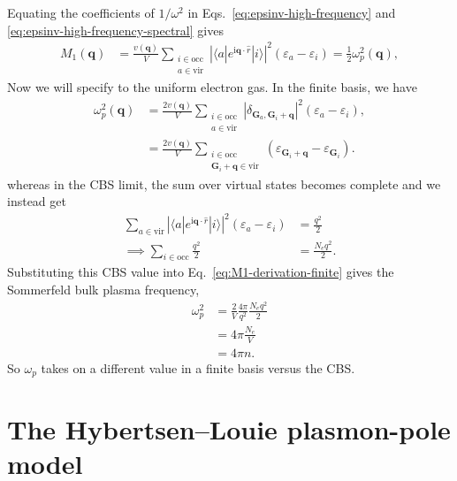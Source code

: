 \documentclass[11pt]{article}
\newcommand{\bG}{\mathbf{G}}
\newcommand{\bq}{\mathbf{q}}
\newcommand{\eps}{\varepsilon}
\newcommand{\ii}{\mathrm{i}}
\begin{document}
Equating the coefficients of $1/\omega^2$ in
Eqs.~\eqref{eq:epsinv-high-frequency} and
\eqref{eq:epsinv-high-frequency-spectral} gives
\begin{align}
  M_1(\bq)
  &=
  \frac{v(\bq)}{V}
  \sum_{\substack{i\in\mathrm{occ}\\a\in\mathrm{vir}}}
  \left|
  \langle a|e^{\ii\bq\cdot\hat r}|i\rangle
  \right|^2
  (\eps_a-\eps_i)
  =
  \frac{1}{2}\omega_p^2(\bq), \label{eq:M1-derivation-finite}
\end{align}
Now we will specify to the uniform electron gas. In the finite basis, we have
\begin{align}
  \omega_p^2(\bq)
  &=
  \frac{2v(\bq)}{V}
  \sum_{\substack{i\in\mathrm{occ}\\a\in\mathrm{vir}}}
  \left|
  \delta_{\bG_a,\bG_i+\bq}
  \right|^2
  (\eps_a-\eps_i),
  \\[6pt]
  &=
  \frac{2v(\bq)}{V}
  \sum_{\substack{i\in\mathrm{occ}\\
                  \bG_i+\bq\in\mathrm{vir}}}
  \left(
  \eps_{\bG_i+\bq}-\eps_{\bG_i}
  \right).
\end{align}
whereas in the CBS limit, the sum over virtual states becomes complete and we instead get
\begin{align}
  \sum_{a\in\mathrm{vir}}
  \left|
  \langle a|e^{\ii\bq\cdot\hat r}|i\rangle
  \right|^2
  (\eps_a-\eps_i)
  &=
  \frac{q^2}{2}\\
  \label{eq:complete-basis-single-particle-fsum}
\implies 
  \sum_{i\in\mathrm{occ}}\frac{q^2}{2}
  &=
  \frac{N_e q^2}{2}.
\end{align}
Substituting this CBS value into Eq.~\eqref{eq:M1-derivation-finite} gives
the Sommerfeld bulk plasma frequency,
\begin{align}
  \omega_p^2
  &=
  \frac{2}{V}
  \frac{4\pi}{q^2}
  \frac{N_e q^2}{2}
  \\[4pt]
  &=
  4\pi \frac{N_e}{V}
  \\[4pt]
  &=
  4\pi n.
  \label{eq:bulk-plasma-frequency}
\end{align}
{So $\omega_p$ takes on a different value in a finite basis versus the CBS.}
\section{The Hybertsen--Louie plasmon-pole model}
\end{document}
